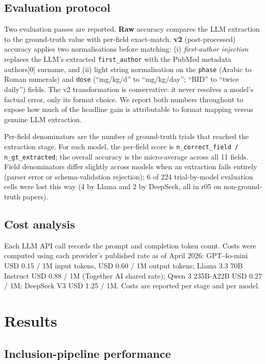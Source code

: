 \documentclass[a4paper,fleqn]{cas-sc}
\begin{document}
\subsection{Evaluation protocol}

Two evaluation passes are reported.
\textbf{Raw} accuracy compares the LLM extraction to the ground-truth
value with per-field exact-match. \textbf{v2} (post-processed) accuracy
applies two normalisations before matching: (i) \emph{first-author
injection} replaces the LLM's extracted \texttt{first\_author} with the
PubMed metadata authors[0] surname, and (ii) light string normalisation
on the \texttt{phase} (Arabic to Roman numerals) and \texttt{dose}
(``mg/kg/d'' to ``mg/kg/day''; ``BID'' to ``twice daily'') fields.
The v2 transformation is conservative: it never resolves a model's
factual error, only its format choice. We report both numbers throughout
to expose how much of the headline gain is attributable to format mapping
versus genuine LLM extraction.

Per-field denominators are the number of ground-truth trials that
reached the extraction stage. For each model, the per-field score is
\texttt{n\_correct\_field / n\_gt\_extracted}; the overall
accuracy is the micro-average across all 11 fields.
Field denominators differ slightly across models when an extraction
fails entirely (parser error or schema-validation rejection); 6 of 224
trial-by-model evaluation cells were lost this way (4 by Llama and 2 by
DeepSeek, all in r05 on non-ground-truth papers).

\subsection{Cost analysis}

Each LLM API call records the prompt and completion token count. Costs
were computed using each provider's published rate as of April 2026:
GPT-4o-mini USD 0.15 / 1M input tokens, USD 0.60 / 1M output tokens;
Llama 3.3 70B Instruct USD 0.88 / 1M (Together AI shared rate);
Qwen 3 235B-A22B USD 0.27 / 1M; DeepSeek V3 USD 1.25 / 1M. Costs are
reported per stage and per model.

\section{Results}\label{sec:results}

\subsection{Inclusion-pipeline performance}
\end{document}
